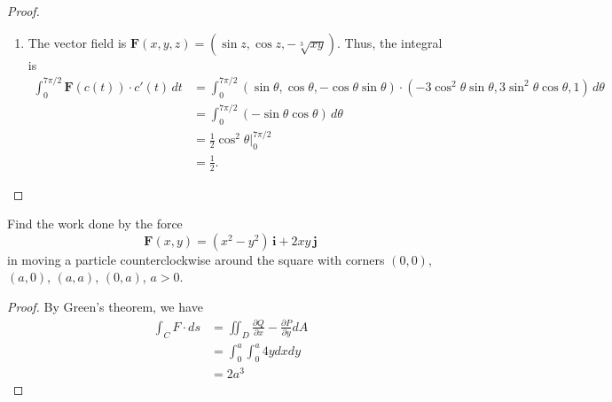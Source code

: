 \documentclass[openany]{book}
\begin{document}
\begin{proof}
\begin{enumerate}
        \item[(b)] The vector field is $\mathbf F(x,y,z)=(\sin z,\cos z,-\sqrt[3]{xy})$. Thus, the integral is
        \begin{align*}
            \int_0^{7\pi/2}\mathbf F(c(t))\cdot c'(t)\,dt &= \int_0^{7\pi/2}(\sin\theta,\cos\theta,-\cos\theta\sin\theta)\cdot\left(-3\cos^2\theta\sin\theta,3\sin^2\theta\cos\theta,1\right)\,d\theta \\
            &= \int_0^{7\pi/2}\left(-\sin\theta\cos\theta\right)\,d\theta \\
            &= \frac12\cos^2\theta\bigg|_0^{7\pi/2} \\
            &= \frac12.
        \end{align*}
    \end{enumerate}
\end{proof}

\begin{prob}[5]
    Find the work done by the force  
    \[
    \mathbf{F}(x, y) = (x^2 - y^2)\,\mathbf{i} + 2xy\,\mathbf{j}
    \]
    in moving a particle counterclockwise around the square with corners \((0, 0)\), \((a, 0)\), \((a, a)\), \((0, a)\), \(a > 0\).
\end{prob}
\begin{proof}
    By Green's theorem, we have 
    \begin{align*}
        \int_CF\cdot ds&=\iint_D\frac{\partial Q}{\partial x}-\frac{\partial P}{\partial y}dA\\
        &=\int_0^a\int_0^a4ydxdy\\
        &=2a^3
    \end{align*}
\end{proof}
\end{document}
